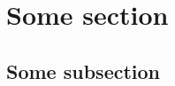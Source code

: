 \documentclass[aspectratio=169]{beamer}
\begin{document}
\section{Some section}
\subsection{Some subsection}
\begin{frame}[plain]
  \sectionpage
\end{frame}
\end{document}

